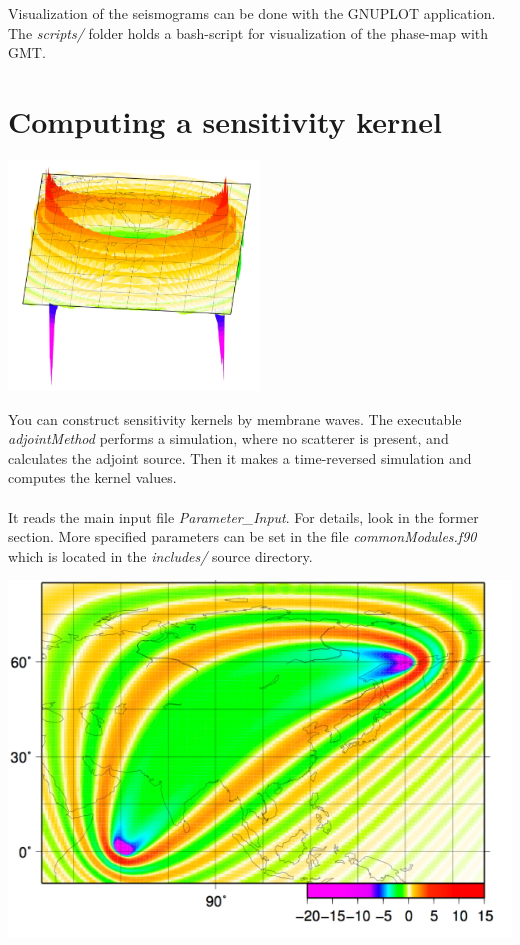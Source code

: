 \documentclass[a4paper,
                          headsepline,
                          listof=totoc,
                          toc=listof,
                          headings=small]{scrreprt} %
\begin{document}
Visualization of the seismograms can be done with the GNUPLOT application.
The \textit{scripts/} folder holds a bash-script for visualization of the
phase-map with GMT.

\chapter{Computing a sensitivity kernel}
\begin{flushright}
\includegraphics[width=0.5\textwidth]{figures/adjointkernel-L150-3D.jpg}
\end{flushright}

You can construct sensitivity kernels by membrane waves.
The executable \textit{adjointMethod} performs a simulation, where no scatterer is present, 
and calculates the adjoint source.
Then it makes a time-reversed simulation and computes the kernel values.
\\
\\    
It reads the main input file \textit{Parameter\_Input}. For details, look in the former
section. More specified parameters can be set
in the file \textit{commonModules.f90} which is located in the \textit{includes/} source directory.

\vspace{2cm}
\begin{center}
\includegraphics[width=1.0\textwidth]{figures/tibet-adjointHet40.jpg}
\end{center}
\end{document}

